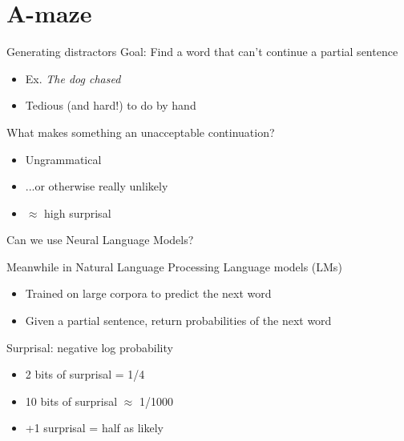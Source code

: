 \documentclass[12pt, xcolor=beamer,table,usenames,dvipsnames, ignorenonframetext, ngerman]{beamer}
\begin{document}
\section{A-maze}

\begin{frame}{Generating distractors}
	\pause
	Goal: Find a word that can't continue a partial sentence
	\begin{itemize}
		\item Ex.  \textit{The dog chased} \pause
		\item Tedious (and hard!) to do by hand
	\end{itemize} \pause
	
	What makes something an unacceptable continuation? \pause
	\begin{itemize}
		\item Ungrammatical \pause
		\item ...or otherwise really unlikely \pause 
		\item $\approx$ high surprisal 
	\end{itemize} \pause
	
	Can we use Neural Language Models?
\end{frame}

\begin{frame}{Meanwhile in Natural Language Processing}
\pause
Language models (LMs)
\begin{itemize}
	\item Trained on large corpora to predict the next word
	\item Given a partial sentence, return probabilities of the next word
\end{itemize}
\pause
Surprisal: negative log probability
\begin{itemize}
	\item 2 bits of surprisal = 1/4
	\item 10 bits of surprisal $\approx$ 1/1000 
	\item +1 surprisal = half as likely
\end{itemize}
\pause
{}
\end{frame}
\end{document}
